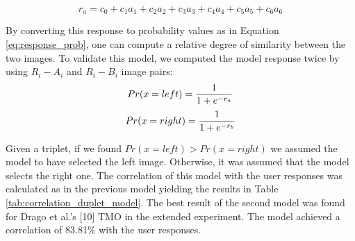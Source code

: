 \begin{equation}
\label{eq:log_regression}
    r_a = c_0 + c_1a_1 + c_2a_2 + c_3a_3 + c_4a_4 + c_5a_5 + c_6a_6 
\end{equation}

By converting this response to probability values as in Equation \ref{eq:response_prob}, one can compute a relative degree of similarity between the two images. To validate this model, we computed the model response twice by using $R_i - A_i$ and $R_i - B_i$ image pairs:
\begin{equation}
    Pr(x = left) = {{1} \over {1 + e^{-r_a}}} 
\end{equation}
\begin{equation}
    Pr(x = right) = {{1} \over {1 + e^{-r_b}}}
\end{equation}


Given a triplet, if we found $Pr(x = left) > Pr(x =right)$ we assumed the model to have selected the left image. Otherwise, it was assumed that the model selects the right one. The correlation of this model with the user responses was calculated as in the previous model yielding the results in Table \ref{tab:correlation_duplet_model}. The best result of the second model was found for Drago et al.’s [10] TMO in the extended experiment. The model achieved a correlation of 83.81\% with the user responses.

